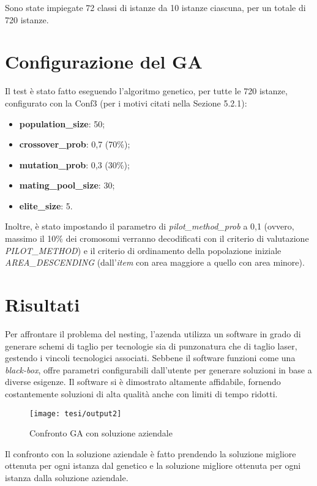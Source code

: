 Sono state impiegate 72 classi di istanze da 10 istanze ciascuna, per un totale di 720 istanze.

\section{Configurazione del GA}

Il test è stato fatto eseguendo l'algoritmo genetico, per tutte le 720 istanze, configurato con la Conf3 (per i motivi citati nella Sezione 5.2.1):
\begin{itemize}
    \item\textbf{population\_size}: 50;
	\item\textbf{crossover\_prob}: 0,7 (70\%);
	\item\textbf{mutation\_prob}: 0,3 (30\%);
	\item\textbf{mating\_pool\_size}: 30;
	\item\textbf{elite\_size}: 5.
\end{itemize}
Inoltre, è stato impostando il parametro di \emph{pilot\_method\_prob} a 0,1 (ovvero, massimo il 10\% dei cromosomi verranno decodificati con il criterio di valutazione \emph{PILOT\_METHOD}) e il criterio di ordinamento della popolazione iniziale \emph{AREA\_DESCENDING} (dall'\emph{item} con area maggiore a quello con area minore).

\section{Risultati}

Per affrontare il problema del nesting, l'azenda utilizza un software in grado di generare schemi di taglio per tecnologie sia di punzonatura che di taglio laser, gestendo i vincoli tecnologici associati. Sebbene il software funzioni come una \emph{black-box}\glsfirstoccur, offre parametri configurabili dall'utente per generare soluzioni in base a diverse esigenze. Il software si è dimostrato altamente affidabile, fornendo costantemente soluzioni di alta qualità anche con limiti di tempo ridotti.

\begin{figure}[!ht] 
    \centering 
    \texttt{[image: tesi/output2]} 
    \caption{Confronto GA con soluzione aziendale}
\end{figure}

Il confronto con la soluzione aziendale è fatto prendendo la soluzione migliore ottenuta per ogni istanza dal genetico e la soluzione migliore ottenuta per ogni istanza dalla soluzione aziendale.

